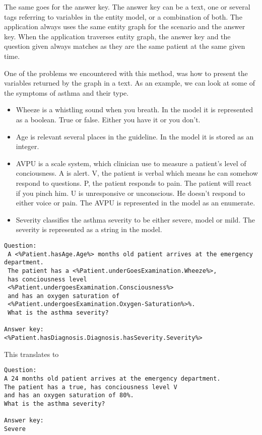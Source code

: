 The same goes for the answer key. The answer key can be a text, one or several tags referring to variables in the entity model, or a combination of both. The application always uses the same entity graph for the scenario and the answer key. When the application traverses entity graph, the answer key and the question given always matches as they are the same patient at the same given time.

One of the problems we encountered with this method, was how to present the variables returned by the graph in a text. As an example, we can look at some of the symptoms of asthma and their type.
\begin{itemize}
	\item Wheeze is a whistling sound when you breath. In the model it is represented as a boolean. True or false. Either you have it or you don't.
	\item Age is relevant several places in the guideline. In the model it is stored as an integer.
	\item AVPU is a scale system, which clinician use to measure a patient's level of conciousness. A is alert. V, the patient is verbal which means he can somehow respond to questions. P, the patient responds to pain. The patient will react if you pinch him. U is unresponsive or unconscious. He doesn't respond to either voice or pain. The AVPU is represented in the model as an enumerate.
	\item Severity classifies the asthma severity to be either severe, model or mild. The severity is represented as a string in the model.
\end{itemize}

\begin{verbatim}
Question:
 A <%Patient.hasAge.Age%> months old patient arrives at the emergency department. 
 The patient has a <%Patient.underGoesExamination.Wheeze%>, 
 has conciousness level 
 <%Patient.undergoesExamination.Consciousness%> 
 and has an oxygen saturation of 
 <%Patient.undergoesExamination.Oxygen-Saturation%>%. 
 What is the asthma severity? 
 
Answer key:
<%Patient.hasDiagnosis.Diagnosis.hasSeverity.Severity%>
\end{verbatim}

This translates to 
\begin{verbatim}
Question:
A 24 months old patient arrives at the emergency department. 
The patient has a true, has conciousness level V 
and has an oxygen saturation of 80%. 
What is the asthma severity? 

Answer key:
Severe
\end{verbatim}


